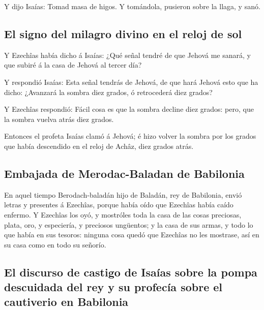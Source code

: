  Y dijo Isaías: Tomad masa de higos. Y tomándola, pusieron
sobre la llaga, y sanó.

\hypertarget{el-signo-del-milagro-divino-en-el-reloj-de-sol}{%
\subsection{El signo del milagro divino en el reloj de
sol}\label{el-signo-del-milagro-divino-en-el-reloj-de-sol}}

 Y Ezechîas había dicho á Isaías: ¿Qué señal tendré de que
Jehová me sanará, y que subiré á la casa de Jehová al tercer día?

 Y respondió Isaías: Esta señal tendrás de Jehová, de que
hará Jehová esto que ha dicho: ¿Avanzará la sombra diez grados, ó
retrocederá diez grados?

 Y Ezechîas respondió: Fácil cosa es que la sombra
decline diez grados: pero, que la sombra vuelva atrás diez grados.

 Entonces el profeta Isaías clamó á Jehová; é hizo volver
la sombra por los grados que había descendido en el reloj de Achâz, diez
grados atrás.

\hypertarget{embajada-de-merodac-baladan-de-babilonia}{%
\subsection{Embajada de Merodac-Baladan de
Babilonia}\label{embajada-de-merodac-baladan-de-babilonia}}

 En aquel tiempo Berodach-baladán hijo de Baladán, rey de
Babilonia, envió letras y presentes á Ezechîas, porque había oído que
Ezechîas había caído enfermo.  Y Ezechîas los oyó, y
mostróles toda la casa de las cosas preciosas, plata, oro, y especiería,
y preciosos ungüentos; y la casa de sus armas, y todo lo que había en
sus tesoros: ninguna cosa quedó que Ezechîas no les mostrase, así en su
casa como en todo su señorío.

\hypertarget{el-discurso-de-castigo-de-isauxedas-sobre-la-pompa-descuidada-del-rey-y-su-profecuxeda-sobre-el-cautiverio-en-babilonia}{%
\subsection{El discurso de castigo de Isaías sobre la pompa descuidada
del rey y su profecía sobre el cautiverio en
Babilonia}\label{el-discurso-de-castigo-de-isauxedas-sobre-la-pompa-descuidada-del-rey-y-su-profecuxeda-sobre-el-cautiverio-en-babilonia}}

